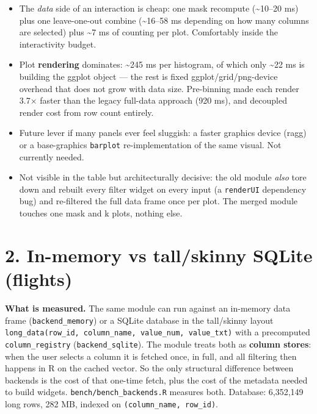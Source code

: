 \documentclass[
  11pt,
]{article}
\providecommand{\tightlist}{%
  \setlength{\itemsep}{0pt}\setlength{\parskip}{0pt}}
\begin{document}
\begin{itemize}
\tightlist
\item
  The \emph{data} side of an interaction is cheap: one mask recompute
  (\textasciitilde10--20 ms) plus one leave-one-out combine
  (\textasciitilde16--58 ms depending on how many columns are selected)
  plus \textasciitilde7 ms of counting per plot. Comfortably inside the
  interactivity budget.
\item
  Plot \textbf{rendering} dominates: \textasciitilde245 ms per
  histogram, of which only \textasciitilde22 ms is building the ggplot
  object --- the rest is fixed ggplot/grid/png-device overhead that does
  not grow with data size. Pre-binning made each render 3.7× faster than
  the legacy full-data approach (920 ms), and decoupled render cost from
  row count entirely.
\item
  Future lever if many panels ever feel sluggish: a faster graphics
  device (ragg) or a base-graphics \texttt{barplot} re-implementation of
  the same visual. Not currently needed.
\item
  Not visible in the table but architecturally decisive: the old module
  \emph{also} tore down and rebuilt every filter widget on every input
  (a \texttt{renderUI} dependency bug) and re-filtered the full data
  frame once per plot. The merged module touches one mask and k plots,
  nothing else.
\end{itemize}

\section{2. In-memory vs tall/skinny SQLite
(flights)}\label{in-memory-vs-tallskinny-sqlite-flights}

\textbf{What is measured.} The same module can run against an in-memory
data frame (\texttt{backend\_memory}) or a SQLite database in the
tall/skinny layout
\texttt{long\_data(row\_id,\ column\_name,\ value\_num,\ value\_txt)}
with a precomputed \texttt{column\_registry} (\texttt{backend\_sqlite}).
The module treats both as \textbf{column stores}: when the user selects
a column it is fetched once, in full, and all filtering then happens in
R on the cached vector. So the only structural difference between
backends is the cost of that one-time fetch, plus the cost of the
metadata needed to build widgets. \texttt{bench/bench\_backends.R}
measures both. Database: 6,352,149 long rows, 282 MB, indexed on
\texttt{(column\_name,\ row\_id)}.
\end{document}
